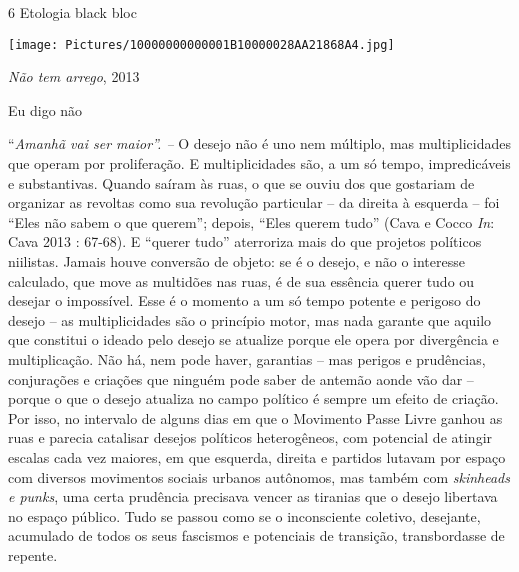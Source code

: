 6 Etologia black bloc

\texttt{[image: Pictures/10000000000001B10000028AA21868A4.jpg]}

\emph{Não tem arrego}, 2013

Eu digo não

``\emph{Amanhã vai ser maior''. -- }O desejo não é uno nem múltiplo, mas
multiplicidades que operam por proliferação. E multiplicidades são, a um
só tempo, impredicáveis e substantivas. Quando saíram às ruas, o que se
ouviu dos que gostariam de organizar as revoltas como sua revolução
particular -- da direita à esquerda -- foi ``Eles não sabem o que
querem''; depois, ``Eles querem tudo'' (Cava e Cocco \emph{In}: Cava
2013 : 67-68). E ``querer tudo'' aterroriza mais do que projetos
políticos niilistas. Jamais houve conversão de objeto: se é o desejo, e
não o interesse calculado, que move as multidões nas ruas, é de sua
essência querer tudo ou desejar o impossível. Esse é o momento a um só
tempo potente e perigoso do desejo -- as multiplicidades são o princípio
motor, mas nada garante que aquilo que constitui o ideado pelo desejo se
atualize porque ele opera por divergência e multiplicação. Não há, nem
pode haver, garantias -- mas perigos e prudências, conjurações e
criações que ninguém pode saber de antemão aonde vão dar -- porque o que
o desejo atualiza no campo político é sempre um efeito de criação. Por
isso, no intervalo de alguns dias em que o Movimento Passe Livre ganhou
as ruas e parecia catalisar desejos políticos heterogêneos, com
potencial de atingir escalas cada vez maiores, em que esquerda, direita
e partidos lutavam por espaço com diversos movimentos sociais urbanos
autônomos, mas também com \emph{skinheads e punks}, uma certa prudência
precisava vencer as tiranias que o desejo libertava no espaço público.
Tudo se passou como se o inconsciente coletivo, desejante, acumulado de
todos os seus fascismos e potenciais de transição, transbordasse de
repente.

